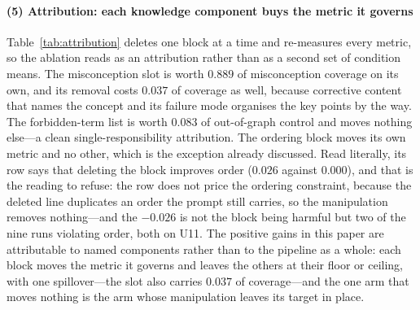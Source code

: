 \documentclass[review,12pt]{elsarticle}
\renewcommand{\_}{\kgunderscore\allowbreak}
\newcommand{\id}[1]{\texttt{#1}}
\begin{document}
\paragraph{(5) Attribution: each knowledge component buys the metric it governs}
Table~\ref{tab:attribution} deletes one block at a time and re-measures every
metric, so the ablation reads as an attribution rather than as a second set of
condition means. The misconception slot is worth $0.889$ of misconception
coverage on its own, and its removal costs $0.037$ of coverage as well,
because corrective content that names the concept and its failure mode
organises the key points by the way. The forbidden-term list is worth $0.083$
of out-of-graph control and moves nothing else---a clean
single-responsibility attribution. The ordering block moves its own metric and
no other, which is the exception already discussed. Read literally, its row
says that deleting the block improves order ($0.026$ against $0.000$), and
that is the reading to refuse: the row does not price the ordering
constraint, because the deleted line duplicates an order the prompt still
carries, so the manipulation removes nothing---and the $-0.026$ is not the
block being harmful but two of the nine runs violating order, both on U11.
The positive gains in this paper are attributable to named components
rather than to the pipeline as a whole: each block moves the metric it governs
and leaves the others at their floor or ceiling, with one spillover---the slot
also carries $0.037$ of coverage---and the one arm that moves nothing is the
arm whose manipulation leaves its target in place.

\begin{table}[t]
\caption{Attribution by ablation: each block is deleted alone and all four
metrics re-measured in the same batch ($n=9$ per arm). $\Delta$ is the arm minus
\id{full}; a block's contribution is the movement in the metric it governs.
Secondary movement above 0.03 is shown as a side effect. The ordering row is a
null manipulation rather than a measurement of the constraint
(\S\ref{sec:boundary}), and its $-0.026$ must not be read as ``deleting the block
helps'': the two order-violating runs of this batch both sit in the \id{full} arm
(on U11), which is also why every other arm reads 0.000. The row prices nothing;
it shows only that the interface cannot withhold the order. Mean (standard
deviation) over resamplings.}
\label{tab:attribution}
\centering
\small

\end{table}
\end{document}
